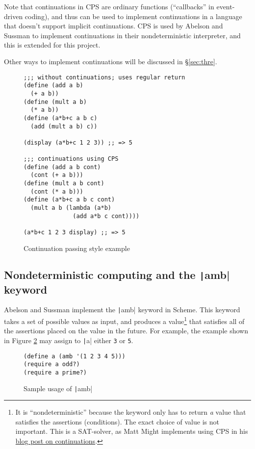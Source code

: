 \documentclass[]{article}
\begin{document}
Note that continuations in CPS are ordinary functions (``callbacks'' in event-driven coding), and thus can be used to implement continuations in a language that doesn't support implicit continuations. CPS is used by Abelson and Sussman to implement continuations in their nondeterministic interpreter, and this is extended for this project.

Other ways to implement continuations will be discussed in \S{\ref{sec:thre}}.

\begin{figure}[]
  \centering
\begin{verbatim}
;;; without continuations; uses regular return
(define (add a b)
  (+ a b))
(define (mult a b)
  (* a b))
(define (a*b+c a b c)
  (add (mult a b) c))

(display (a*b+c 1 2 3)) ;; => 5

;;; continuations using CPS
(define (add a b cont)
  (cont (+ a b)))
(define (mult a b cont)
  (cont (* a b)))
(define (a*b+c a b c cont)
  (mult a b (lambda (a*b)
              (add a*b c cont))))

(a*b+c 1 2 3 display) ;; => 5
\end{verbatim}
  \caption{Continuation passing style example}
  \label{fig:cps}
\end{figure}

\subsection{Nondeterministic computing and the \texttt|amb| keyword}
\label{sec:nond}

Abelson and Sussman implement the \texttt|amb| keyword in Scheme. This keyword takes a set of possible values as input, and produces a value\footnote{It is ``nondeterministic'' because the keyword only has to return \textit{a} value that satisfies the assertions (conditions). The exact choice of value is not important. This is a SAT-solver, as Matt Might implements using CPS in his \href{https://matt.might.net/articles/programming-with-continuations--exceptions-backtracking-search-threads-generators-coroutines/}{blog post on continuations}.} that satisfies all of the assertions placed on the value in the future. For example, the example shown in Figure \ref{fig:amb} may assign to \texttt|a| either \texttt{3} or \texttt{5}.

\begin{figure}[]
  \centering
\begin{verbatim}
(define a (amb '(1 2 3 4 5)))
(require a odd?)
(require a prime?)
\end{verbatim}
  \caption{Sample usage of \texttt|amb|}
  \label{fig:amb}
\end{figure}
\end{document}
